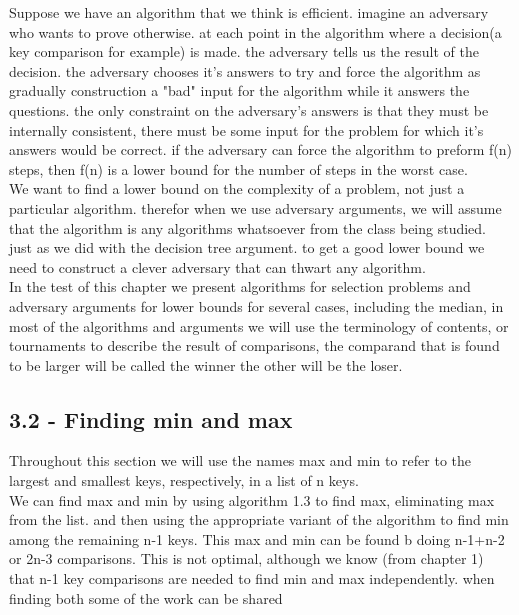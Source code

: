 \documentclass[a4paper,10pt,titlepage]{report}
\begin{document}
Suppose we have an algorithm that we think is efficient. imagine an adversary who wants to prove otherwise. at each point in the algorithm where a decision(a key comparison for example) is made. the adversary tells us the result of the decision. the adversary chooses it's answers to try and force the algorithm as gradually construction a "bad" input for the algorithm while it answers the questions. the only constraint on the adversary's answers is that they must be internally consistent, there must be some input for the problem for which it's answers would be correct. if the adversary can force the algorithm to preform f(n) steps, then f(n) is a lower bound for the number of steps in the worst case.\\
We want to find a lower bound on the complexity of a problem, not just a particular algorithm. therefor when we use adversary arguments, we will assume that the algorithm is any algorithms whatsoever from the class being studied. just as we did with the decision tree argument. to get a good lower bound we need to construct a clever adversary that can thwart any algorithm.\\
In the test of this chapter we present algorithms for selection problems and adversary arguments for lower bounds for several cases, including the median, in most of the algorithms and arguments we will use the terminology of contents, or tournaments to describe the result of comparisons, the comparand that is found to be larger will be called the winner the other will be the loser.

\subsection{3.2 - Finding min and max}
Throughout this section we will use the names max and min to refer to the largest and smallest keys, respectively, in a list of n keys.\\

We can find max and min by using algorithm 1.3 to find max, eliminating max from the list. and then using the appropriate variant of the algorithm to find min among the remaining n-1 keys. This max and min can be found b doing n-1+n-2 or 2n-3 comparisons. This is not optimal, although we know (from chapter 1) that n-1 key comparisons are needed to find min and max independently. when finding both some of the work can be shared
\end{document}

